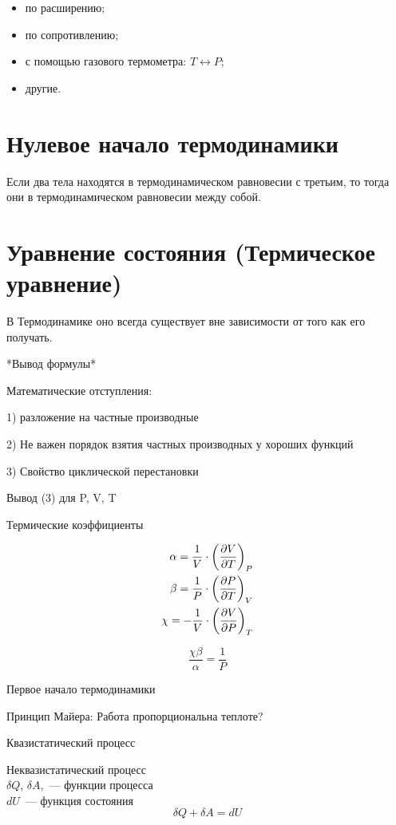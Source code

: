 \documentclass[../main.tex]{subfiles}
\begin{document}
    \begin{itemize}
        \item по расширению;
        \item по сопротивлению;
        \item с помощью газового термометра: $T \leftrightarrow P$;
        \item другие.
    \end{itemize}

    \section{Нулевое начало термодинамики}

    \begin{proposition}
        Если два тела находятся в термодинамическом равновесии с третьим, то тогда они в термодинамическом равновесии между собой.
    \end{proposition}
    
    \section{Уравнение состояния (Термическое уравнение)}

    \begin{note}
        В Термодинамике оно всегда существует вне зависимости от того как его получать.
    \end{note}
    *Вывод формулы*

    Математические отступления:

        1) разложение на частные производные

        2) Не важен порядок взятия частных производных у хороших функций

        3) Свойство циклической перестановки

    Вывод (3) для P, V, T

    Термические коэффициенты

    \begin{eqnarray}
        \alpha  =   \frac{1}{V} \cdot \left(\frac{\partial V}{\partial T}\right)_{P} \\
        \beta   =   \frac{1}{P} \cdot \left(\frac{\partial P}{\partial T}\right)_{V} \\
        \chi    = - \frac{1}{V} \cdot \left(\frac{\partial V}{\partial P}\right)_{T}
    \end{eqnarray}

    \begin{equation}
        \frac{\chi \beta}{\alpha} = \frac{1}{P}
    \end{equation}

    Первое начало термодинамики 

    Принцип Майера: Работа пропорциональна теплоте?

    Квазистатический процесс

    Неквазистатический процесс\\
    $\delta Q$, $\delta A$,~--- функции процесса\\
    $dU$~--- функция состояния\\

    $$ \delta Q + \delta A = dU$$
\end{document}

